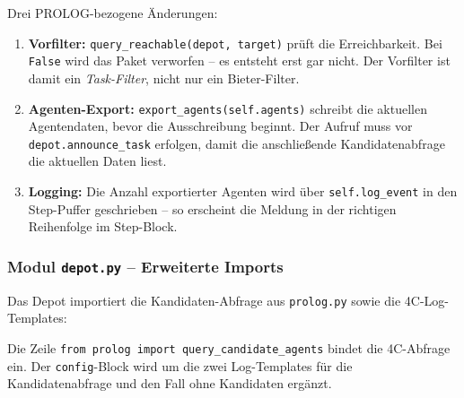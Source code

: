 



Drei \acs{PROLOG}-bezogene Änderungen:
\begin{enumerate}
    \item \textbf{Vorfilter:} \texttt{query\_reachable(depot, target)} prüft die Erreichbarkeit. Bei \texttt{False} wird das Paket verworfen -- es entsteht erst gar nicht. Der Vorfilter ist damit ein \textit{Task-Filter}, nicht nur ein Bieter-Filter.
    \item \textbf{Agenten-Export:} \texttt{export\_agents(self.agents)} schreibt die aktuellen Agentendaten, bevor die Ausschreibung beginnt. Der Aufruf muss vor \texttt{depot.announce\_task} erfolgen, damit die anschließende Kandidatenabfrage die aktuellen Daten liest.
    \item \textbf{Logging:} Die Anzahl exportierter Agenten wird über \texttt{self.log\_event} in den Step-Puffer geschrieben -- so erscheint die Meldung in der richtigen Reihenfolge im Step-Block.
\end{enumerate}


\subsubsection{Modul \texttt{depot.py} – Erweiterte Imports}

Das Depot importiert die Kandidaten-Abfrage aus \texttt{prolog.py} sowie die 4C-Log-Templates:





Die Zeile \texttt{from prolog import query\_candidate\_agents} bindet die 4C-Abfrage ein. Der \texttt{config}-Block wird um die zwei Log-Templates für die Kandidatenabfrage und den Fall ohne Kandidaten ergänzt.

